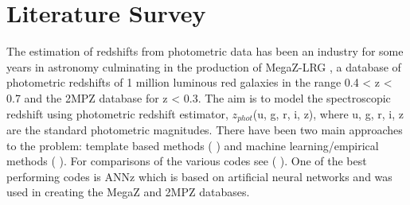 \section{Literature Survey}
The estimation of redshifts from photometric data has been an industry for some years in astronomy culminating in the production of MegaZ-LRG \cite{collister2007megaz}, a database of photometric redshifts of 1 million luminous red galaxies in the range 0.4 < z < 0.7 and the 2MPZ database\cite{bilicki2013two} for z < 0.3. The aim is to model the spectroscopic redshift using photometric redshift estimator, $z_{phot}$(u, g, r, i, z), where {u, g, r, i, z} are the standard photometric magnitudes. There have been two main approaches to the problem: template based methods (\cite{benitez2000bayesian} \cite{brammer2008eazy} \cite{kotulla2009impact} \cite{dahlen2010detailed} \cite{bolzonella2000photometric} \cite{arnouts1999measuring} \cite{ilbert2006accurate} \cite{assef2008low} \cite{assef2010low} \cite{feldmann2006zurich}) and machine learning/empirical methods (\cite{collister2004annz} \cite{gerdes2010arborz} \cite{wolf2009bayesian} \cite{csabai2007multidimensional} \cite{carliles2010random} \cite{brescia2014catalogue} \cite{elliott2015overlooked}). For comparisons of the various codes see (\cite{abdalla2011comparison} \cite{hildebrandt2010phat} \cite{dahlen2013critical}). One of the best performing codes is ANNz\cite{collister2004annz} which is based on artificial neural networks and was used in creating the MegaZ and 2MPZ databases.
